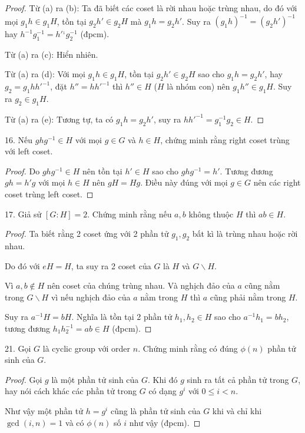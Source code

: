 \begin{proof}
    Từ (a) ra (b): Ta đã biết các coset là rời nhau hoặc trùng nhau, do đó với mọi $g_1 h \in g_1 H$, tồn tại $g_2 h' \in g_2 H$ mà $g_1 h = g_2 h'$. Suy ra $(g_1 h)^{-1} = (g_2 h')^{-1}$ hay $h^{-1} g_1^{-1} = h'^{_1} g_2^{-1}$ (đpcm).

    Từ (a) ra (c): Hiển nhiên.

    Từ (a) ra (d): Với mọi $g_1 h \in g_1 H$, tồn tại $g_2 h' \in g_2 H$ sao cho $g_1 h = g_2 h'$, hay $g_2 = g_1 h h'^{-1}$, đặt $h'' = h h'^{-1}$ thì $h'' \in H$ ($H$ là nhóm con) nên $g_1 h'' \in g_1 H$. Suy ra $g_2 \in g_1 H$.

    Từ (a) ra (e): Tương tự, ta có $g_1 h = g_2 h'$, suy ra $h h'^{-1}= g_1^{-1} g_2 \in H$.
\end{proof}


16. Nếu $g h g^{-1} \in H$ với mọi $g \in G$ và $h \in H$, chứng minh rằng right coset trùng với left coset.

\begin{proof}
    Do $g h g^{-1} \in H$ nên tồn tại $h' \in H$ sao cho $g h g^{-1} = h'$. Tương đương $g h = h' g$ với mọi $h \in H$ nên $g H = H g$. Điều này đúng với mọi $g \in G$ nên các right coset trùng left coset.
\end{proof}

17. Giả sử $[G:H]=2$. Chứng minh rằng nếu $a, b$ không thuộc $H$ thì $ab \in H$.

\begin{proof}
    Ta biết rằng 2 coset ứng với 2 phần tử $g_1, g_2$ bất kì là trùng nhau hoặc rời nhau.

    Do đó với $eH = H$, ta suy ra 2 coset của $G$ là $H$ và $G \backslash H$.

    Vì $a, b \not\in H$ nên coset của chúng trùng nhau. Và nghịch đảo của $a$ cũng nằm trong $G \backslash H$ vì nếu nghịch đảo của $a$ nằm trong $H$ thì $a$ cũng phải nằm trong $H$.

    Suy ra $a^{-1} H = b H$. Nghĩa là tồn tại 2 phần tử $h_1, h_2 \in H$ sao cho $a^{-1} h_1 = b h_2$, tương đương $h_1 h_2^{-1} = a b \in H$ (đpcm).
\end{proof}

21. Gọi $G$ là cyclic group với order $n$. Chứng minh rằng có đúng $\phi(n)$ phần tử sinh của $G$.

\begin{proof}
    Gọi $g$ là một phần tử sinh của $G$. Khi đó $g$ sinh ra tất cả phần tử trong $G$, hay nói cách khác các phần tử trong $G$ có dạng $g^i$ với $0 \leq i < n$.

    Như vậy một phần tử $h = g^i$ cũng là phần tử sinh của $G$ khi và chỉ khi $\gcd(i, n) = 1$ và có $\phi(n)$ số $i$ như vậy (đpcm).
\end{proof}

